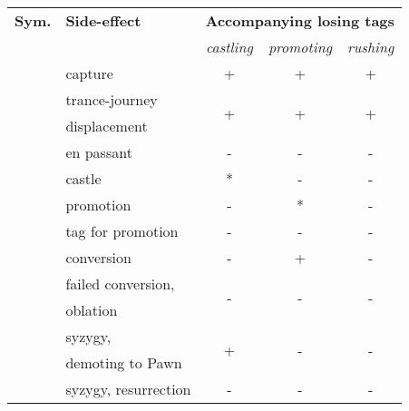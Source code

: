 \begin{table}[!h]
\centering
\begin{tabular}{ rlccc }
\toprule
\textbf{Sym.}               & \textbf{Side-effect}  & \multicolumn{3}{c}{ \textbf{Accompanying losing tags} }              \\ \cmidrule{3-5}
                            &                       & \emph{castling}      & \emph{promoting}      & \emph{rushing}        \\
\midrule
\alg{*}                     & capture               & +                    & +                     & +                     \\ \cmidrule{1-5}
\multirow{2}{*}{\alg{<}}    & trance-journey        & \multirow{2}{*}{+}   & \multirow{2}{*}{+}    & \multirow{2}{*}{+}    \\
                            & displacement          &                      &                       &                       \\ \cmidrule{1-5}
\alg{:}                     & en passant            & -                    & -                     & -                     \\
\alg{\&}                    & castle                & *                    & -                     & -                     \\
\alg{=}                     & promotion             & -                    & *                     & -                     \\
\alg{=}                     & tag for promotion     & -                    & -                     & -                     \\
\alg{\%}                    & conversion            & -                    & +                     & -                     \\ \cmidrule{1-5}
\multirow{2}{*}{\alg{\%\%}} & failed conversion,    & \multirow{2}{*}{-}   & \multirow{2}{*}{-}    & \multirow{2}{*}{-}    \\
                            & oblation              &                      &                       &                       \\ \cmidrule{1-5}
\multirow{2}{*}{\alg{>}}    & syzygy,               & \multirow{2}{*}{+}   & \multirow{2}{*}{-}    & \multirow{2}{*}{-}    \\
                            & demoting to Pawn      &                      &                       &                       \\ \cmidrule{1-5}
\alg{\$}                    & syzygy, resurrection  & -                    & -                     & -                     \\ \cmidrule{1-5}

\end{tabular}
\end{table}

